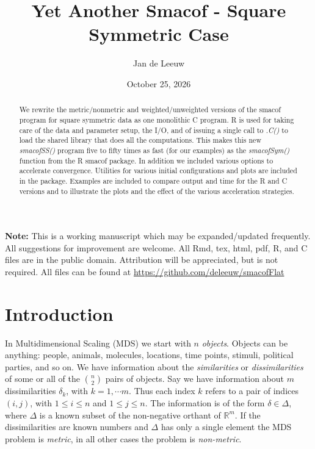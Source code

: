 \documentclass[
  12pt,
  letterpaper,
  DIV=11,
  numbers=noendperiod]{scrartcl}
\title{Yet Another Smacof - Square Symmetric Case}
\author{Jan de Leeuw}
\date{October 25, 2026}
\renewcommand*\contentsname{Table of contents}
\newcommand\contentsname{Table of contents}
\begin{document}
\maketitle
\begin{abstract}
We rewrite the metric/nonmetric and weighted/unweighted versions of the
smacof program for square symmetric data as one monolithic C program. R
is used for taking care of the data and parameter setup, the I/O, and of
issuing a single call to \emph{.C()} to load the shared library that
does all the computations. This makes this new \emph{smacofSS()} program
five to fifty times as fast (for our examples) as the \emph{smacofSym()}
function from the R smacof package. In addition we included various
options to accelerate convergence. Utilities for various initial
configurations and plots are included in the package. Examples are
included to compare output and time for the R and C versions and to
illustrate the plots and the effect of the various acceleration
strategies.
\end{abstract}

\renewcommand*\contentsname{Table of contents}
{
\setcounter{tocdepth}{3}
\tableofcontents
}

\textbf{Note:} This is a working manuscript which may be
expanded/updated frequently. All suggestions for improvement are
welcome. All Rmd, tex, html, pdf, R, and C files are in the public
domain. Attribution will be appreciated, but is not required. All files
can be found at \url{https://github.com/deleeuw/smacofFlat}

\section{Introduction}\label{introduction}

In Multidimensional Scaling (MDS) we start with \(n\) \emph{objects}.
Objects can be anything: people, animals, molecules, locations, time
points, stimuli, political parties, and so on. We have information about
the \emph{similarities} or \emph{dissimilarities} of some or all of the
\(\binom{n}{2}\) pairs of objects. Say we have information about \(m\)
dissimilarities \(\delta_k\), with \(k = 1,\cdots m\). Thus each index
\(k\) refers to a pair of indices \((i,j)\), with \(1 \leq i \leq n\)
and \(1 \leq j \leq n\). The information is of the form
\(\delta \in \Delta\), where \(\Delta\) is a known subset of the
non-negative orthant of \(\mathbb{R}^m\). If the dissimilarities are
known numbers and \(\Delta\) has only a single element the MDS problem
is \emph{metric}, in all other cases the problem is \emph{non-metric}.
\end{document}
